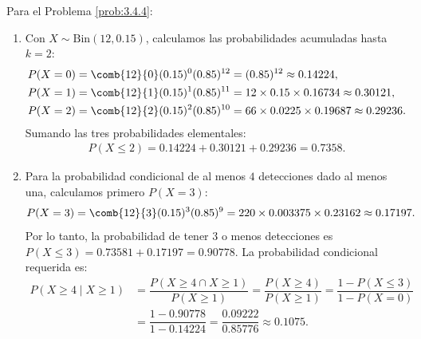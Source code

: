 \begin{solucion}
	\label{sol:3.4.4}
	Para el Problema \ref{prob:3.4.4}:
	\begin{enumerate}
		\item Con $X \sim \text{Bin}(12, 0.15)$, calculamos las probabilidades acumuladas hasta $k=2$:
		\begin{align*}
			P(X = 0) &= \comb{12}{0} (0.15)^0 (0.85)^{12} = (0.85)^{12} \approx 0.14224, \\
			P(X = 1) &= \comb{12}{1} (0.15)^1 (0.85)^{11} = 12 \times 0.15 \times 0.16734 \approx 0.30121, \\
			P(X = 2) &= \comb{12}{2} (0.15)^2 (0.85)^{10} = 66 \times 0.0225 \times 0.19687 \approx 0.29236.
		\end{align*}
		Sumando las tres probabilidades elementales:
		\begin{align*}
			P(X \le 2) = 0.14224 + 0.30121 + 0.29236 = 0.7358.
		\end{align*}
		\item Para la probabilidad condicional de al menos $4$ detecciones dado al menos una, calculamos primero $P(X = 3)$:
		\begin{align*}
			P(X = 3) &= \comb{12}{3} (0.15)^3 (0.85)^9 = 220 \times 0.003375 \times 0.23162 \approx 0.17197.
		\end{align*}
		Por lo tanto, la probabilidad de tener $3$ o menos detecciones es $P(X \le 3) = 0.73581 + 0.17197 = 0.90778$. La probabilidad condicional requerida es:
		\begin{align*}
			P(X \ge 4 \mid X \ge 1) &= \dfrac{P(X \ge 4 \cap X \ge 1)}{P(X \ge 1)} = \dfrac{P(X \ge 4)}{P(X \ge 1)} = \dfrac{1 - P(X \le 3)}{1 - P(X = 0)} \\
			&= \dfrac{1 - 0.90778}{1 - 0.14224} = \dfrac{0.09222}{0.85776} \approx 0.1075.
		\end{align*}
	\end{enumerate}
\end{solucion}

